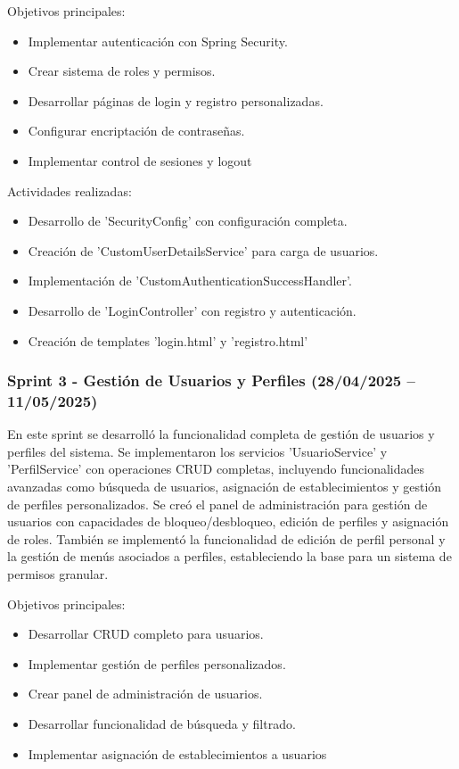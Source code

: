 Objetivos principales:
\begin{itemize}
\tightlist
\item
Implementar autenticación con Spring Security.
\item
Crear sistema de roles y permisos.
\item
Desarrollar páginas de login y registro personalizadas.
\item
Configurar encriptación de contraseñas.
\item
Implementar control de sesiones y logout
\end{itemize}

Actividades realizadas:
\begin{itemize}
\tightlist
\item
Desarrollo de 'SecurityConfig' con configuración completa.
\item
Creación de 'CustomUserDetailsService' para carga de usuarios.
\item
Implementación de 'CustomAuthenticationSuccessHandler'.
\item
Desarrollo de 'LoginController' con registro y autenticación.
\item
Creación de templates 'login.html' y 'registro.html'
\end{itemize}

\subsubsection{Sprint 3 - Gestión de Usuarios y Perfiles (28/04/2025 – 11/05/2025)} 
En este sprint se desarrolló la funcionalidad completa de gestión de usuarios y perfiles del sistema. Se implementaron los servicios 'UsuarioService' y 'PerfilService' con operaciones CRUD completas, incluyendo funcionalidades avanzadas como búsqueda de usuarios, asignación de establecimientos y gestión de perfiles personalizados. Se creó el panel de administración para gestión de usuarios con capacidades de bloqueo/desbloqueo, edición de perfiles y asignación de roles. También se implementó la funcionalidad de edición de perfil personal y la gestión de menús asociados a perfiles, estableciendo la base para un sistema de permisos granular.

Objetivos principales:
\begin{itemize}
\tightlist
\item
Desarrollar CRUD completo para usuarios.
\item
Implementar gestión de perfiles personalizados.
\item
Crear panel de administración de usuarios.
\item
Desarrollar funcionalidad de búsqueda y filtrado.
\item
Implementar asignación de establecimientos a usuarios
\end{itemize}

